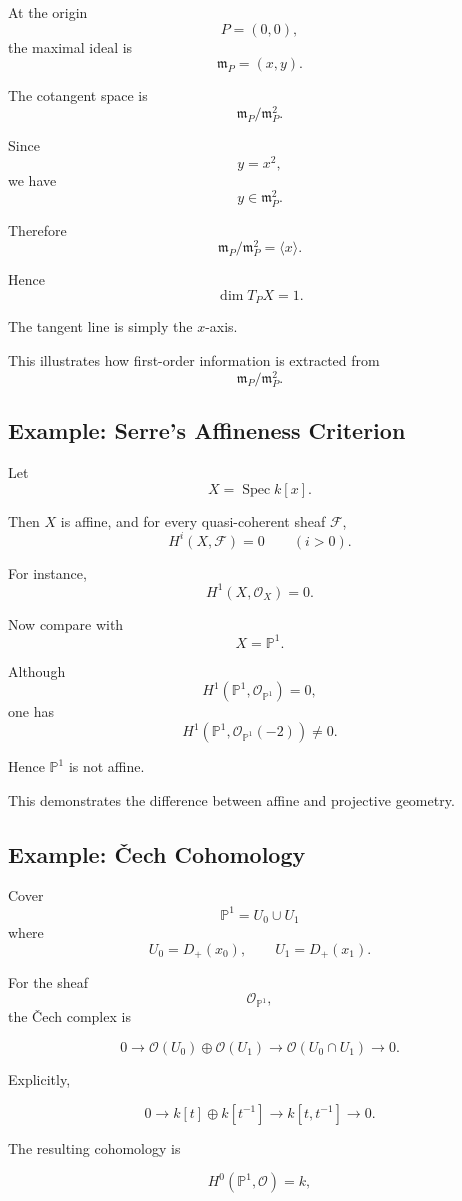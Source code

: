 \documentclass[12pt,a4paper]{article}
\theoremstyle{notespace}
\begin{document}
At the origin
\[
P=(0,0),
\]
the maximal ideal is
\[
\mathfrak m_P=(x,y).
\]

The cotangent space is
\[
\mathfrak m_P/\mathfrak m_P^2.
\]

Since
\[
y=x^2,
\]
we have
\[
y\in \mathfrak m_P^2.
\]

Therefore
\[
\mathfrak m_P/\mathfrak m_P^2
=
\langle x\rangle.
\]

Hence
\[
\dim T_PX=1.
\]

The tangent line is simply the \(x\)-axis.

This illustrates how first-order information is extracted from
\[
\mathfrak m_P/\mathfrak m_P^2.
\]

\subsection{Example: Serre's Affineness Criterion}

Let
\[
X=\operatorname{Spec}k[x].
\]

Then \(X\) is affine, and for every quasi-coherent sheaf \(\mathcal F\),
\[
H^i(X,\mathcal F)=0
\qquad
(i>0).
\]

For instance,
\[
H^1(X,\mathcal O_X)=0.
\]

Now compare with
\[
X=\mathbb P^1.
\]

Although
\[
H^1(\mathbb P^1,\mathcal O_{\mathbb P^1})=0,
\]
one has
\[
H^1(\mathbb P^1,\mathcal O_{\mathbb P^1}(-2))
\neq 0.
\]

Hence \(\mathbb P^1\) is not affine.

This demonstrates the difference between affine and projective geometry.

\subsection{Example: \v{C}ech Cohomology}

Cover
\[
\mathbb P^1
=
U_0\cup U_1
\]
where
\[
U_0=D_+(x_0),
\qquad
U_1=D_+(x_1).
\]

For the sheaf
\[
\mathcal O_{\mathbb P^1},
\]
the \v{C}ech complex is

\[
0
\to
\mathcal O(U_0)\oplus\mathcal O(U_1)
\to
\mathcal O(U_0\cap U_1)
\to
0.
\]

Explicitly,

\[
0
\to
k[t]\oplus k[t^{-1}]
\to
k[t,t^{-1}]
\to
0.
\]

The resulting cohomology is

\[
H^0(\mathbb P^1,\mathcal O)
=
k,
\]
\end{document}
